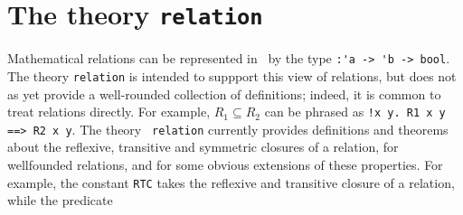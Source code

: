\section{The theory {\tt relation}}\label{relation}

Mathematical relations can be represented in \HOL\ by the type
{\small\verb+:'a -> 'b -> bool+}. The theory {\small\verb+relation+}
is intended to suppport this view of relations, but does not as yet
provide a well-rounded collection of definitions; indeed, it is common
to treat relations directly. For example, $R_1 \subseteq R_2$ can be
phrased as {\small\verb+!x y. R1 x y ==> R2 x y+}. The theory {\tt
  relation} currently provides definitions and theorems about the
reflexive, transitive and symmetric closures of a relation, for
wellfounded relations, and for some obvious extensions of these
properties.  For example, the constant {\small\verb!RTC!} takes the
reflexive and transitive closure of a relation, while the predicate
